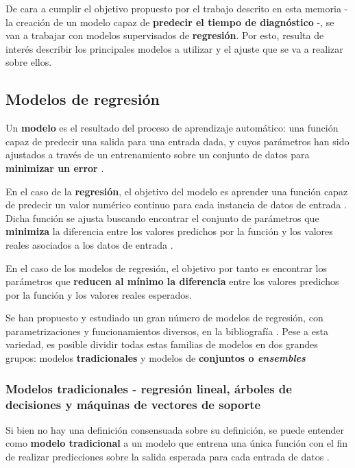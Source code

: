 De cara a cumplir el objetivo propuesto por el trabajo descrito en esta memoria - la creación de un modelo capaz de \textbf{predecir el tiempo de diagnóstico} -, se van a trabajar con modelos supervisados de \textbf{regresión}. Por esto, resulta de interés describir los principales modelos a utilizar y el ajuste que se va a realizar sobre ellos.

\subsection{Modelos de regresión}

Un \textbf{modelo} es el resultado del proceso de aprendizaje automático: una función capaz de predecir una salida para una entrada dada, y cuyos parámetros han sido ajustados a través de un entrenamiento sobre un conjunto de datos para \textbf{minimizar un error} \cite{Burkov2019TheHM}. 

En el caso de la \textbf{regresión}, el objetivo del modelo es aprender una función capaz de predecir un valor numérico continuo para cada instancia de datos de entrada \cite{mlprobabilistic}. Dicha función se ajusta buscando encontrar el conjunto de parámetros que \textbf{minimiza} la diferencia entre los valores predichos por la función y los valores reales asociados a los datos de entrada \cite{Burkov2019TheHM}.

En el caso de los modelos de regresión, el objetivo por tanto es encontrar los parámetros que \textbf{reducen al mínimo la diferencia} entre los valores predichos por la función y los valores reales esperados.

Se han propuesto y estudiado un gran número de modelos de regresión, con parametrizaciones y funcionamientos diversos, en la bibliografía \cite{tai2021surveyregressionalgorithmsconnections}. Pese a esta variedad, es posible dividir todas estas familias de modelos en dos grandes grupos: modelos \textbf{tradicionales} y modelos de \textbf{conjuntos o \textit{ensembles}} \cite{aima}

\subsubsection{Modelos tradicionales - regresión lineal, árboles de decisiones y máquinas de vectores de soporte}

Si bien no hay una definición consensuada sobre su definición, se puede entender como \textbf{modelo tradicional} a un modelo que entrena una única función con el fin de realizar predicciones sobre la salida esperada para cada entrada de datos \cite{aima}.

